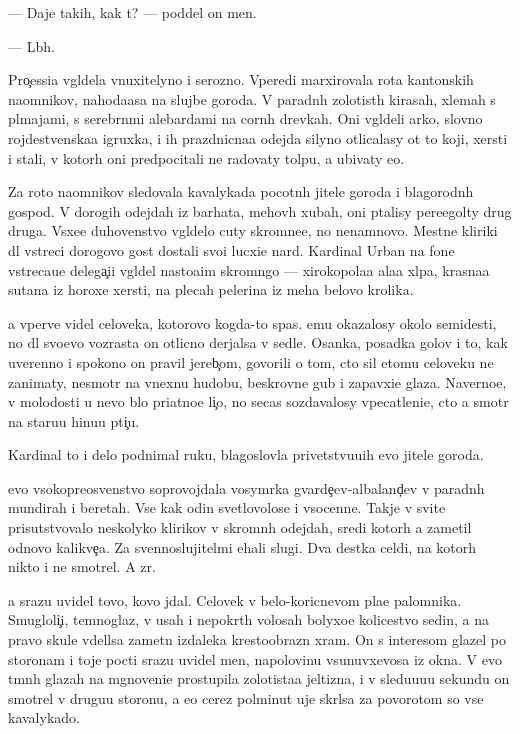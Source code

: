 \documentclass[10pt]{book}
\begin{document}
— Daje takih, kak t{\yi}? — poddel on men{\ia}.

— L{\iu}b{\yi}h.

Pro{\c}essi{\y}a v{\yi}gl{\ia}dela vnuxitelyno i ser{\y}ozno. Vperedi marxirovala rota kantonskih na{\y}omnikov, nahod{\ia}{\x}a{\y}asa na slujbe goroda. V paradn{\yi}h zolotist{\yi}h kirasah, xlemah s pl{\iu}majami, s serebr{\ia}n{\yi}mi alebardami na corn{\yi}h drevkah. Oni v{\yi}gl{\ia}deli {\y}arko, slovno rojdestvenska{\y}a igruxka, i ih prazdnicna{\y}a odejda silyno otlicalasy ot to{\y} koji, xersti i stali, v kotor{\yi}h oni predpocitali ne radovaty tolpu, a ubivaty {\y}e{\y}o.

Za roto{\y} na{\y}omnikov sledovala kavalykada pocotn{\yi}h jitele{\y} goroda i blagorodn{\yi}h gospod. V dorogih odejdah iz barhata, mehov{\yi}h xubah, oni p{\yi}talisy pere{\x}egol{\ia}ty drug druga. V{\yi}sxe{\y}e duhovenstvo v{\yi}gl{\ia}delo cuty skromne{\y}e, no nenamnovo. Mestn{\yi}{\y}e kliriki dl{\ia} vstreci dorogovo gost{\ia} dostali svo{\y}i lucxi{\y}e nar{\ia}d{\yi}. Kardinal Urban na fone vstreca{\y}u{\x}e{\y} delega{\c}i{\y}i v{\yi}gl{\ia}del nasto{\y}a{\x}im skromn{\ia}go{\y} — xirokopola{\y}a ala{\y}a xl{\ia}pa, krasna{\y}a sutana iz horoxe{\y} xersti, na plecah pelerina iz meha belovo krolika.

{\Y}a vperv{\yi}{\y}e videl celoveka, kotorovo kogda-to spas. {\Y}emu okazalosy okolo semides{\ia}ti, no dl{\ia} svo{\y}evo vozrasta on otlicno derjalsa v sedle. Osanka, posadka golov{\yi} i to, kak uverenno i spoko{\y}no on pravil jereb{\c}om, govorili o tom, cto sil etomu celoveku ne zanimaty, nesmotr{\ia} na vnexn{\iu}{\y}u hudobu, beskrovn{\yi}{\y}e gub{\yi} i zapavxi{\y}e glaza. Naverno{\y}e, v molodosti u nevo b{\yi}lo pri{\y}atno{\y}e li{\c}o, no se{\y}cas sozdavalosy vpecatleni{\y}e, cto {\y}a smotr{\iu} na staru{\y}u hi{\x}nu{\y}u pti{\c}u.

Kardinal to i delo podnimal ruku, blagoslovl{\ia}{\y}a privetstvu{\y}u{\x}ih {\y}evo jitele{\y} goroda.

{\Y}evo v{\yi}sokopreosv{\ia}{\x}enstvo soprovojdala vosym{\e}rka gvarde{\y}{\c}ev-albaland{\c}ev v paradn{\yi}h mundirah i beretah. Vse kak odin svetlovolos{\yi}{\y}e i v{\yi}socenn{\yi}{\y}e. Takje v svite prisutstvovalo neskolyko klirikov v skromn{\yi}h odejdah, sredi kotor{\yi}h {\y}a zametil odnovo kalikve{\c}a. Za sv{\ia}{\x}ennoslujitel{\ia}mi {\y}ehali slugi. Dva des{\ia}tka cel{\ia}di, na kotor{\yi}h nikto i ne smotrel. A zr{\ia}.

{\Y}a srazu uvidel tovo, kovo jdal. Celovek v belo-koricnevom pla{\x}e palomnika. Smugloli{\c}i{\y}, temnoglaz{\yi}{\y}, v usah i nepokr{\yi}t{\yi}h volosah bolyxo{\y}e kolicestvo sedin{\yi}, a na pravo{\y} skule v{\yi}del{\ia}lsa zametn{\yi}{\y} izdaleka krestoobrazn{\yi}{\y} xram. On s interesom glazel po storonam i toje pocti srazu uvidel men{\ia}, napolovinu v{\yi}sunuvxevosa iz okna. V {\y}evo t{\e}mn{\yi}h glazah na mgnoveni{\y}e prostupila zolotista{\y}a jeltizna, i v sledu{\y}u{\x}u{\y}u sekundu on smotrel v drugu{\y}u storonu, a {\y}e{\x}o cerez polminut{\yi} uje skr{\yi}lsa za povorotom so vse{\y} kavalykado{\y}.
\end{document}
